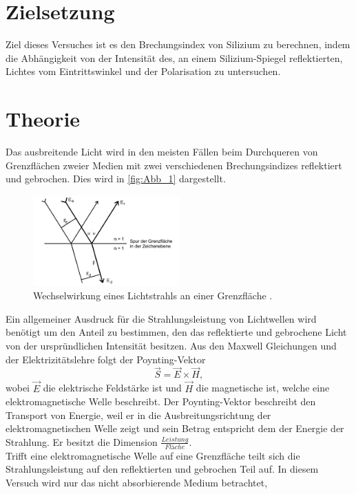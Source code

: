 \section{Zielsetzung}
\label{sec:Zielsetzung}
Ziel dieses Versuches ist es den Brechungsindex von Silizium zu berechnen, indem die
Abhängigkeit von der Intensität des, an einem Silizium-Spiegel reflektierten, Lichtes vom 
Eintrittswinkel und der Polarisation zu untersuchen.
\section{Theorie}
\label{sec:Theorie}
Das ausbreitende Licht wird in den meisten Fällen beim Durchqueren von Grenzflächen zweier
Medien mit zwei verschiedenen Brechungsindizes reflektiert und gebrochen. Dies wird in \autoref{fig:Abb_1} dargestellt.
\begin{figure}[H]
    \centering
    \includegraphics[width=0.5\textwidth]{Abbildung/Abb_1.png}
    \caption {Wechselwirkung eines Lichtstrahls an einer Grenzfläche \cite{V407}.}
    \label{fig:Abb_1}
\end{figure}
Ein allgemeiner Ausdruck für die Strahlungsleistung von Lichtwellen wird benötigt um den Anteil zu bestimmen,
den das reflektierte und gebrochene Licht von der urspründlichen Intensität besitzen.
Aus den Maxwell Gleichungen und der Elektrizitätslehre folgt der Poynting-Vektor
\begin{equation*}
    \vec{S} = \vec{E} \times \vec{H},
    \label{eqn:Poynting}
\end{equation*}
wobei $\vec{E}$ die elektrische Feldstärke ist und $\vec{H}$ die magnetische ist, welche eine
elektromagnetische Welle beschreibt. Der Poynting-Vektor beschreibt den Transport von Energie,
weil er in die Ausbreitungsrichtung der elektromagnetischen Welle zeigt und sein Betrag entspricht
dem der Energie der Strahlung. Er besitzt die Dimension $\frac{Leistung}{Fläche}$.\\
Trifft eine elektromagnetische Welle auf eine Grenzfläche teilt sich die Strahlungsleistung auf den 
reflektierten und gebrochen Teil auf. In diesem Versuch wird nur das nicht absorbierende Medium betrachtet,
